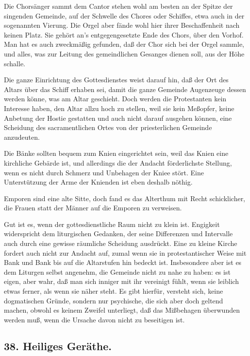 Die Chorsänger sammt dem Cantor stehen wohl am besten an der Spitze der singenden Gemeinde, auf der Schwelle des Chores oder Schiffes, etwa auch in der sogenannten Vierung. Die Orgel aber fände wohl hier ihrer Beschaffenheit nach keinen Platz. Sie gehört an's entgegengesetzte Ende des Chors, über den Vorhof. Man hat es auch zweckmäßig gefunden, daß der Chor sich bei der Orgel sammle, und alles, was zur Leitung des gemeindlichen Gesanges dienen soll, aus der Höhe schalle.

Die ganze Einrichtung des Gottesdienstes weist darauf hin, daß der Ort des Altars über das Schiff erhaben sei, damit die ganze Gemeinde Augenzeuge dessen werden könne, was am Altar geschieht. Doch werden die Protestanten kein Interesse haben, den Altar allzu hoch zu stellen, weil sie kein Meßopfer, keine Anbetung der Hostie gestatten und auch nicht darauf ausgehen können, eine Scheidung des sacramentlichen Ortes von der priesterlichen Gemeinde anzudeuten.

Die Bänke sollten bequem zum Knien eingerichtet sein, weil das Knien eine kirchliche Gebärde ist, und allerdings die der Andacht förderlichste Stellung, wenn es nicht durch Schmerz und Unbehagen der Kniee stört. Eine Unterstützung der Arme der Knienden ist eben deshalb nöthig.

Emporen sind eine alte Sitte, doch fand es das Alterthum mit Recht schicklicher, die Frauen statt der Männer auf die Emporen zu verweisen.

Gut ist es, wenn der gottesdienstliche Raum nicht zu klein ist. Engigkeit widerspricht dem liturgischen Gedanken, der seine Differenzen und Intervalle auch durch eine gewisse räumliche Scheidung ausdrückt. Eine zu kleine Kirche fordert auch nicht zur Andacht auf, zumal wenn sie in protestantischer Weise mit Bank und Bank bis auf die Altarstufen hin bedeckt ist. Insbesondere aber ist es dem Liturgen selbst angenehm, die Gemeinde nicht zu nahe zu haben: es ist eigen, aber wahr, daß man sich inniger mit ihr vereinigt fühlt, wenn sie leiblich etwas ferner, als wenn sie näher steht. Es gibt hierfür, versteht sich, keine dogmatischen Gründe, sondern nur psychische, die sich aber doch geltend machen, obwohl es keinem Zweifel unterliegt, daß das Mißbehagen überwunden werden muß, wenn die Ursache davon nicht zu beseitigen ist.

\subsection*{38. Heiliges Geräthe.}

